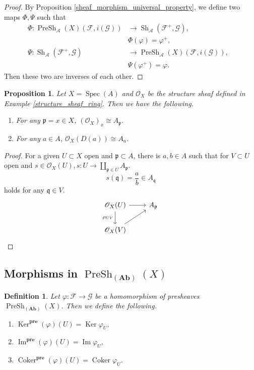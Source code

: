 \documentclass{article}
\newtheorem{proposition}{Proposition}[section]
\newtheorem{definition}{Definition}[section]
\numberwithin{equation}{section}
\DeclareMathOperator{\Spec}{Spec}
\DeclareMathOperator{\PreSh}{PreSh}
\DeclareMathOperator{\Sh}{Sh}
\DeclareMathOperator{\Ker}{Ker}
\DeclareMathOperator{\Image}{Im}
\DeclareMathOperator{\Coker}{Coker}
\begin{document}
\begin{proof}
By Proposition \ref{sheaf_morphism_universal_property}, we define two maps $\Phi,\Psi$ such that
\begin{align*}
\Phi:\PreSh_\mathcal{A}(X)(\mathcal{F},i(\mathcal{G})) &\to \Sh_{\mathcal{A}}(\mathcal{F}^+,\mathcal{G}),&\\
& \Phi(\varphi) = \varphi^+,\\
\Psi:\Sh_{\mathcal{A}}(\mathcal{F}^+,\mathcal{G})&\to\PreSh_\mathcal{A}(X)(\mathcal{F},i(\mathcal{G})),&\\
 &\Psi(\varphi^+)  = \varphi.
\end{align*}
Then these two are inverses of each other.
\end{proof}

\begin{proposition}
Let $X=\Spec(A)$ and $\mathcal{O}_X$ be the structure sheaf defined in Example \ref{structure_sheaf_ring}. Then we have the following.
\begin{enumerate}[1).]
\item For any $\mathfrak{p}=x\in X$, $(\mathcal{O}_{X})_x \cong A_{\mathfrak{p}}$.
\item For any $a\in A$, $\mathcal{O}_X(D(a)) \cong A_a$.
\end{enumerate}
\end{proposition}

\begin{proof}
For a given $U\subset X$ open and $\mathfrak{p}\subset A$, there is $a,b\in A$ such that for $V\subset U$ open and $s\in\mathcal{O}_X(U), s:U\to\coprod_{\mathfrak{p}\in U}A_{\mathfrak{p}}$.
\begin{equation*}
s(\mathfrak{q}) = {\frac a b}\in A_{\mathfrak{q}}
\end{equation*}
holds for any $\mathfrak{q}\in V$.
\[
\begin{tikzcd}
\mathcal{O}_X(U) \arrow[r] \arrow[d, "\rho_{UV}"'] & A_\mathfrak{p} \\
\mathcal{O}_X(V) \arrow[ru]                        &               
\end{tikzcd}
\]
\end{proof}

\subsection{Morphisms in $\PreSh_{(\mathbf{Ab})}(X)$}

\begin{definition}
Let $\varphi:\mathcal{F}\to\mathcal{G}$ be a homomorphism of presheaves $\PreSh_{(\mathbf{Ab})}(X)$. Then we define the following.
\begin{enumerate}[1).]
\item $\Ker^{\mathbf{pre}}(\varphi)(U) = \Ker\varphi_U$,
\item $\Image^{\mathbf{pre}}(\varphi)(U) = \Image\varphi_U$,
\item $\Coker^{\mathbf{pre}}(\varphi)(U) = \Coker\varphi_U$.
\end{enumerate}
\end{definition}
\end{document}

